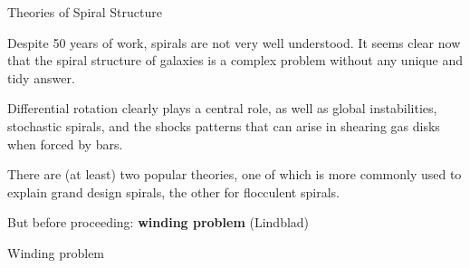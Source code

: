 \documentclass[letterpaper,landscape]{slides}
\begin{document}




\begin{slide}
\begin{center}
\vskip 0.1in
\end{center}



\vfill
\end{slide}



\begin{slide}

\begin{center}
{\large \color{red} Theories of Spiral Structure   }
\end{center}


Despite 50 years of work, spirals are not very well understood.
It seems clear now that {\color{blue} the spiral structure of galaxies 
is a complex problem} without any unique and tidy answer.

Differential rotation clearly plays a central role,
as well as global instabilities, stochastic spirals, and the shocks patterns that can 
arise in shearing gas disks when forced by bars.	

There are (at least) two popular theories, one of which is more commonly used to explain 
grand design spirals, the other for flocculent spirals.  

But before proceeding: {\bf winding problem} (Lindblad)



\vfill
\end{slide}


\begin{slide}
\begin{center}
{\large \color{red} Winding problem }
\end{center}

\begin{center}




\end{center}

\vfill
\end{slide}
\end{document}
